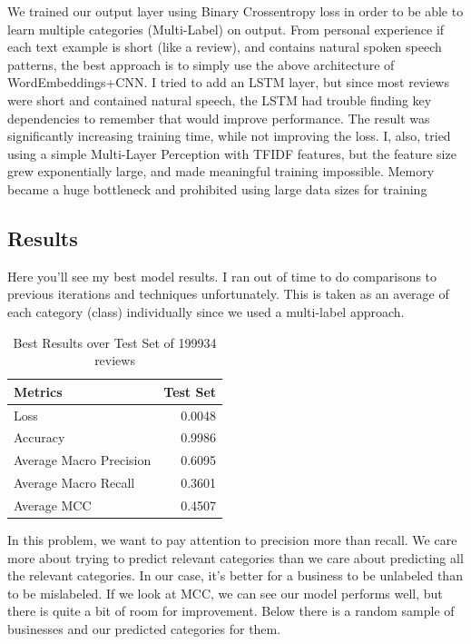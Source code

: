 \documentclass{article}
\begin{document}
We trained our output layer using Binary Crossentropy loss in order to be able to learn multiple categories (Multi-Label) on output. From personal experience if each text example is short (like a review), and contains natural spoken speech patterns, the best approach is to simply use the above architecture of WordEmbeddings+CNN. I tried to add an LSTM layer, but since most reviews were short and contained natural speech, the LSTM had trouble finding key dependencies to remember that would improve performance. The result was significantly increasing training time, while not improving the loss. I, also, tried using a simple Multi-Layer Perception with TFIDF features, but the feature size grew exponentially large, and made meaningful training impossible. Memory became a huge bottleneck and prohibited using large data sizes for training

\subsection*{Results}

Here you'll see my best model results. I ran out of time to do comparisons to previous iterations and techniques unfortunately. This is taken as an average of each category (class) individually since we used a multi-label approach.  

\begin{table}[h!]
	\begin{center}
		\caption{Best Results over Test Set of 199934 reviews}
		\label{tab:table1}
		\begin{tabular}{l|r} %
			\textbf{Metrics} & \textbf{Test Set}\\
			\hline
			Loss & 0.0048\\
			Accuracy & 0.9986\\
			Average Macro Precision &  0.6095\\
			Average Macro Recall &  0.3601\\
			Average MCC & 0.4507\\
		\end{tabular}
	\end{center}
\end{table}

In this problem, we want to pay attention to precision more than recall. We care more about trying to predict relevant categories than we care about predicting all the relevant categories. In our case, it's better for a business to be unlabeled than to be mislabeled. If we look at MCC, we can see our model performs well, but there is quite a bit of room for improvement. Below there is a random sample of businesses and our predicted categories for them. 
\end{document}
